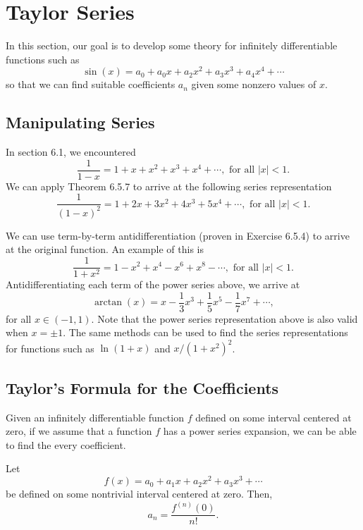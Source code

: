 \section{Taylor Series}

In this section, our goal is to develop some theory for infinitely differentiable functions such as 
    \[  \sin(x) = a_0 + a_{0} x  + a_{2} x^{2} + a_{3} x^{3} + a_{4} x^{4} + \dotsb \]
so that we can find suitable coefficients \( a_{n} \) given some nonzero values of \( x  \).

\subsection{Manipulating Series}
In section 6.1, we encountered 
\[  \frac{ 1 }{ 1-x  } = 1 + x + x^{2} + x^{3} + x^{4} + \dotsb, \text{ for all } | x  | < 1. \tag{1} \]
We can apply Theorem 6.5.7 to arrive at the following series representation
\[  \frac{ 1 }{ (1-x)^2  } = 1 + 2x + 3 x^{2} + 4 x^{3} + 5 x^{4} + \dotsb, \text{ for all } | x  | < 1.   \]

We can use term-by-term antidifferentiation (proven in Exercise 6.5.4) to arrive at the original function. An example of this is 
\[  \frac{ 1 }{ 1 + x^2  }  = 1 - x^{2} + x^{4 } - x^{6 } + x^{8 } - \dotsb, \text{ for all } | x  | < 1. \]
Antidifferentiating each term of the power series above, we arrive at 
\[  \arctan(x) = x - \frac{ 1 }{ 3 }  x^{3} + \frac{ 1 }{ 5 } x^{5} - \frac{ 1 }{ 7 } x^{7} + \dotsb,  \]
for all \( x \in (-1,1) \). Note that the power series representation above is also valid when \( x = \pm 1  \). The same methods can be used to find the series representations for functions such as \( \ln ( 1 + x ) \) and \( x  / (1 + x^2 )^2 \).

\subsection{Taylor's Formula for the Coefficients} 

Given an infinitely differentiable function \( f  \) defined on some interval centered at zero, if we assume that a function \( f  \) has a power series expansion, we can be able to find the every coefficient.

\begin{tcolorbox}
    \begin{thm}
    Let 
    \[  f(x) = a_0 + a_{1}x + a_{2} x^{2} + a_{3} x^{3} + \dotsb \]
    be defined on some nontrivial interval centered at zero. Then, 
    \[ a_n = \frac{ f^{(n)}(0) }{ n! }. \]
    \end{thm}
\end{tcolorbox}


